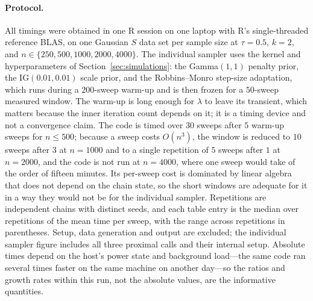 \paragraph{Protocol.} All timings were obtained in one R session on one laptop with R's single-threaded reference BLAS, on one Gaussian $S$ data set per sample size at $\tau = 0.5$, $k = 2$, and $n \in \{250, 500, 1000, 2000, 4000\}$. The individual sampler uses the kernel and hyperparameters of Section~\ref{sec:simulations}: the Gamma$(1,1)$ penalty prior, the IG$(0.01, 0.01)$ scale prior, and the Robbins--Monro step-size adaptation, which runs during a $200$-sweep warm-up and is then frozen for a $50$-sweep measured window. The warm-up is long enough for $\lambda$ to leave its transient, which matters because the inner iteration count depends on it; it is a timing device and not a convergence claim. The \citet{onizuka2024fast} code is timed over $30$ sweeps after $5$ warm-up sweeps for $n \le 500$; because a sweep costs $O(n^3)$, the window is reduced to $10$ sweeps after $3$ at $n = 1000$ and to a single repetition of $5$ sweeps after $1$ at $n = 2000$, and the code is not run at $n = 4000$, where one sweep would take of the order of fifteen minutes. Its per-sweep cost is dominated by linear algebra that does not depend on the chain state, so the short windows are adequate for it in a way they would not be for the individual sampler. Repetitions are independent chains with distinct seeds, and each table entry is the median over repetitions of the mean time per sweep, with the range across repetitions in parentheses. Setup, data generation and output are excluded; the individual sampler figure includes all three proximal calls and their internal setup. Absolute times depend on the host's power state and background load---the same code ran several times faster on the same machine on another day---so the ratios and growth rates within this run, not the absolute values, are the informative quantities.

